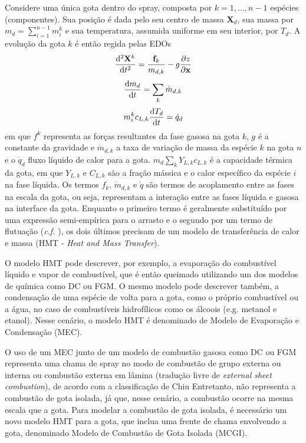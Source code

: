 Considere uma única gota dentro do spray, composta por $k=1,\ldots,n-1$ espécies (componentes).
Sua posição é dada pelo seu centro de massa $\mathbf X_d$, sua massa por $m_d = \sum_{i=1}^{n-1} m_{i}^k$ e sua temperatura, assumida uniforme em seu interior, por $T_d$.
A evolução da gota $k$ é então regida pelas EDOs \cite{JennyB2012}
\begin{equation}
    \frac{\mathrm{d}^2 \mathbf X^k}{\mathrm{d} t^2} =
    \frac{\mathbf f_k}{ m_{d,k}} -
    g \frac{\partial z}{\partial \mathbf x}
    \label{eq:Xd}
\end{equation}
\begin{equation}
    \frac{\mathrm{d} m_{d}}{\mathrm{d} t} = \sum_{k} \dot m_{d,k}
    \label{eq:md}
\end{equation}
\begin{equation}
    m_i^k c_{L,k} \frac{\mathrm{d} T_d}{\mathrm{d} t} = \dot q_d
    \label{eq:Td}
\end{equation}
em que $f^k$ representa as forças resultantes da fase gasosa na gota $k$, $g$ é a constante da gravidade e $\dot m_{d,k}$ a taxa de variação de massa da espécie $k$ na gota $n$ e o $\dot q_d$ fluxo líquido de calor para a gota.
$ m_d \sum_k Y_{L,k} c_{L,k}$ é a capacidade térmica da gota, em que 
$Y_{L,k}$ e $C_{L,k}$ são a fração mássica e o calor específico da  espécie $i$ na fase líquida.
Os termos $f_k$, $\dot m_{d,k}$ e $\dot q$ são termos de acoplamento entre as fases na escala da gota, ou seja, representam a interação entre as fases líquida e gasosa na interface da gota.
Enquanto o primeiro termo é geralmente substituído por uma expressão semi-empírica para o arrasto e o segundo por um termo de flutuação (\emph{c.f.} \cite[p. 16]{JennyB2012}), os dois últimos precisam de um modelo de transferência de calor e massa (HMT - \emph{Heat and Mass Transfer}).

O modelo HMT pode descrever, por exemplo, a evaporação do combustível líquido e vapor de combustível, que é então queimado utilizando um dos modelos de química como DC ou FGM.
O mesmo modelo pode descrever também, a condensação de uma espécie de volta para a gota, como o próprio combustível ou a água, no caso de combustíveis hidrofílicos como os álcoois (e.g. metanol e etanol).
Nesse cenário, o modelo HMT é denominado de Modelo de Evaporação e Condensação (MEC).

O uso de um MEC junto de um modelo de combustão gasosa como DC ou FGM representa uma chama de spray no modo de combustão de grupo externa ou interna ou combustão externa em lâmina (tradução livre de \emph{external sheet combustion}), de acordo com a classificação de Chiu 
Entretanto, não representa a combustão de gota isolada, já que, nesse cenário, a combustão ocorre na mesma escala que a gota.
Para modelar a combustão de gota isolada, é necessário um novo modelo HMT para a gota, que inclua uma frente de chama envolvendo a gota, denominado Modelo de Combustão de Gota Isolada (MCGI). 


